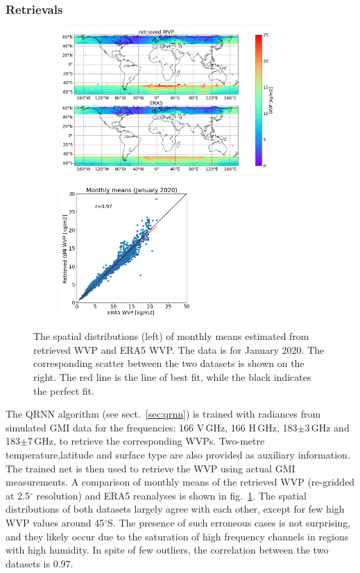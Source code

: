 \documentclass[12pt,oneside,a4paper]{article}
\begin{document}
\subsubsection{Retrievals}
\label{sec:preliminary_results}
\begin{figure}[t]
	\centering
	\begin{subfigure}{.54\textwidth}
		\includegraphics[height = 55mm]{Figures/WVP_spatial_jan2020.png}
	\end{subfigure}
	\begin{subfigure}{.34\textwidth}
	\includegraphics[height = 50mm]{Figures/WVP_scatter_monthlymean.png} 
	\end{subfigure}
	\caption{The spatial distributions (left) of monthly means estimated from retrieved WVP and ERA5 WVP. The data is for January 2020. The corresponding scatter between the two datasets is shown on the right. The red line is the line of best fit, while the black indicates the perfect fit.}
	\label{fig:WVP_retrievals}
\end{figure}

The QRNN algorithm (see sect.~\ref{sec:qrnn}) is trained with radiances from simulated GMI data for the frequencies: 166 V\,GHz, 166 H\,GHz, 183$\pm$3\,GHz and 183$\pm$7\,GHz, to retrieve the corresponding WVPs. Two-metre temperature,latitude and surface type are also provided as auxiliary information. The trained net is then used to retrieve the WVP using actual GMI measurements. A comparison of monthly means of the  retrieved WVP (re-gridded at 2.5$^{\circ}$ resolution) and ERA5 reanalyses is shown in fig.~\ref{fig:WVP_retrievals}. The spatial distributions of both datasets largely agree with each other, except for few high WVP values around 45$^{\circ}$S. The presence of such erroneous cases is not surprising, and they likely occur due to the saturation of high frequency channels in regions with high humidity. In spite of few outliers, the correlation between the two datasets is 0.97.
\end{document}
